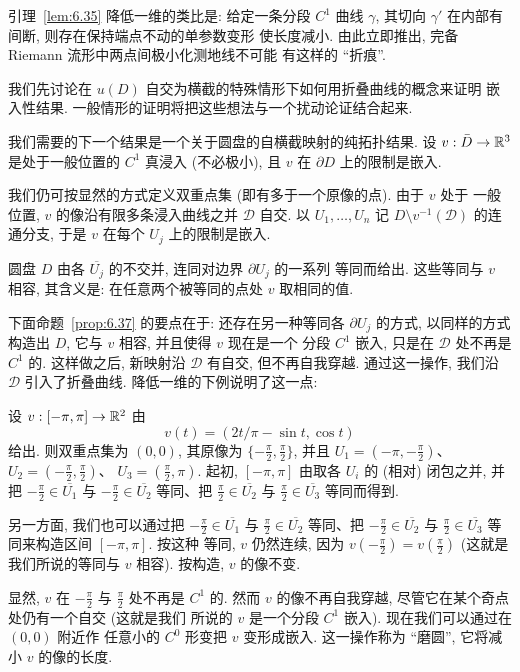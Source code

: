 引理~\ref{lem:6.35} 降低一维的类比是: 给定一条分段 $C^1$ 曲线
$\gamma$, 其切向 $\gamma'$ 在内部有间断, 则存在保持端点不动的单参数变形
使长度减小. 由此立即推出, 完备 Riemann 流形中两点间极小化测地线不可能
有这样的 ``折痕''.

我们先讨论在 $u(D)$ 自交为横截的特殊情形下如何用折叠曲线的概念来证明
嵌入性结果. 一般情形的证明将把这些想法与一个扰动论证结合起来.

我们需要的下一个结果是一个关于圆盘的自横截映射的纯拓扑结果. 设
$v:\bar{D}\to\mathbb{R}^3$ 是处于一般位置的 $C^1$ 真浸入 (不必极小), 且 $v$ 在
$\partial D$ 上的限制是嵌入.

我们仍可按显然的方式定义双重点集 (即有多于一个原像的点). 由于 $v$ 处于
一般位置, $v$ 的像沿有限多条浸入曲线之并 $\mathcal{D}$ 自交. 以
$U_1,\ldots,U_n$ 记 $D\setminus v^{-1}(\mathcal{D})$ 的连通分支, 于是
$v$ 在每个 $U_j$ 上的限制是嵌入.

圆盘 $D$ 由各 $\overline{U_j}$ 的不交并, 连同对边界 $\partial U_j$ 的一系列
等同而给出. 这些等同与 $v$ 相容, 其含义是: 在任意两个被等同的点处 $v$
取相同的值.

下面命题~\ref{prop:6.37} 的要点在于: 还存在另一种等同各 $\partial U_j$
的方式, 以同样的方式构造出 $D$, 它与 $v$ 相容, 并且使得 $v$ 现在是一个
分段 $C^1$ 嵌入, 只是在 $\mathcal{D}$ 处不再是 $C^1$ 的. 这样做之后,
新映射沿 $\mathcal{D}$ 有自交, 但不再自我穿越. 通过这一操作, 我们沿
$\mathcal{D}$ 引入了折叠曲线. 降低一维的下例说明了这一点:

\begin{example}
\label{ex:6.36}
设 $v:[-\pi,\pi]\to\mathbb{R}^2$ 由
\begin{equation}
v(t)=(2t/\pi-\sin t,\cos t)
\label{eq:6.131}
\end{equation}
给出. 则双重点集为 $(0,0)$, 其原像为
$\{-\frac{\pi}{2},\frac{\pi}{2}\}$, 并且
$U_1=(-\pi,-\frac{\pi}{2})$、$U_2=(-\frac{\pi}{2},\frac{\pi}{2})$、
$U_3=(\frac{\pi}{2},\pi)$. 起初, $[-\pi,\pi]$ 由取各 $U_i$ 的 (相对)
闭包之并, 并把 $-\frac{\pi}{2}\in\overline{U_1}$ 与
$-\frac{\pi}{2}\in\overline{U_2}$ 等同、把
$\frac{\pi}{2}\in\overline{U_2}$ 与
$\frac{\pi}{2}\in\overline{U_3}$ 等同而得到.

另一方面, 我们也可以通过把 $-\frac{\pi}{2}\in\overline{U_1}$ 与
$\frac{\pi}{2}\in\overline{U_2}$ 等同、把
$-\frac{\pi}{2}\in\overline{U_2}$ 与
$\frac{\pi}{2}\in\overline{U_3}$ 等同来构造区间 $[-\pi,\pi]$. 按这种
等同, $v$ 仍然连续, 因为
$v(-\frac{\pi}{2})=v(\frac{\pi}{2})$ (这就是我们所说的等同与 $v$ 相容).
按构造, $v$ 的像不变.

显然, $v$ 在 $-\frac{\pi}{2}$ 与 $\frac{\pi}{2}$ 处不再是 $C^1$ 的.
然而 $v$ 的像不再自我穿越, 尽管它在某个奇点处仍有一个自交 (这就是我们
所说的 $v$ 是一个分段 $C^1$ 嵌入). 现在我们可以通过在 $(0,0)$ 附近作
任意小的 $C^0$ 形变把 $v$ 变形成嵌入. 这一操作称为 ``磨圆'', 它将减小
$v$ 的像的长度.
\end{example}

